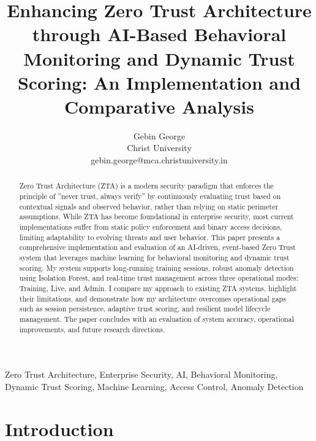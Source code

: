\documentclass[conference]{IEEEtran}
\begin{document}
\title{Enhancing Zero Trust Architecture through AI-Based Behavioral Monitoring and Dynamic Trust Scoring: An Implementation and Comparative Analysis}

\author{Gebin George\\Christ University\\gebin.george@mca.christuniversity.in}

\maketitle

\begin{abstract}
Zero Trust Architecture (ZTA) is a modern security
paradigm that enforces the principle of ”never trust, always verify”
by continuously evaluating trust based on contextual signals
and observed behavior, rather than relying on static perimeter
assumptions. While ZTA has become foundational in enterprise
security, most current implementations suffer from static policy
enforcement and binary access decisions, limiting adaptability
to evolving threats and user behavior. This paper presents a
comprehensive implementation and evaluation of an AI-driven,
event-based Zero Trust system that leverages machine learning
for behavioral monitoring and dynamic trust scoring. My system
supports long-running training sessions, robust anomaly detection
using Isolation Forest, and real-time trust management across
three operational modes: Training, Live, and Admin. I compare
my approach to existing ZTA systems, highlight their limitations,
and demonstrate how my architecture overcomes operational
gaps such as session persistence, adaptive trust scoring, and
resilient model lifecycle management. The paper concludes with
an evaluation of system accuracy, operational improvements, and
future research directions.
\end{abstract}

\begin{IEEEkeywords}
Zero Trust Architecture, Enterprise Security, AI, Behavioral Monitoring, Dynamic Trust Scoring, Machine Learning, Access Control, Anomaly Detection
\end{IEEEkeywords}

\section{Introduction}
\end{document}
